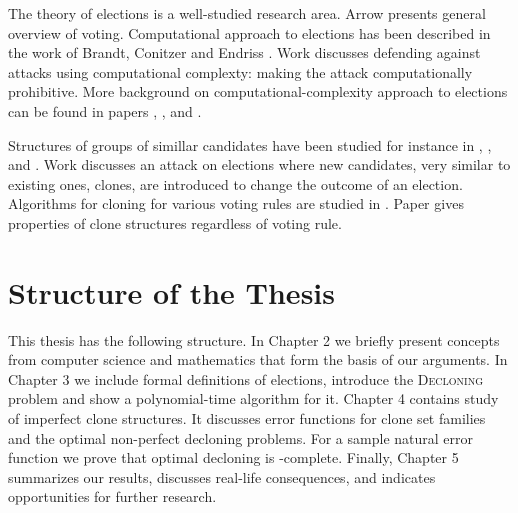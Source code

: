 The theory of elections is a well-studied research area.
Arrow \cite{handbook} presents general overview of voting.
Computational approach to elections has been described in the work of
Brandt, Conitzer and Endriss \cite{compsocialchoice}.
Work \cite{usingcomplexity} discusses defending against attacks using computational complexty:
making the attack computationally prohibitive.
More background on computational-complexity approach to elections
can be found in papers \cite{usingcomp1}, \cite{usingcomp2}, and \cite{controlbyadding}.

Structures of groups of simillar candidates have been studied for instance in
\cite{clones1}, \cite{clones2}, and \cite{clones3}.
Work \cite{independenceofclones} discusses an attack on elections where new candidates,
very similar to existing ones, clones, are introduced to change the outcome of an election.
Algorithms for cloning for various voting rules are studied in \cite{cloninginelections}.
Paper \cite{clonestructures} gives properties of clone structures regardless of voting rule.


\section{Structure of the Thesis}

This thesis has the following structure.
In Chapter 2 we briefly present concepts from computer science
and mathematics that form the basis of our arguments.
In Chapter 3 we include formal definitions of elections, introduce the \textsc{Decloning} problem
and show a polynomial-time algorithm for it.
Chapter 4 contains study of imperfect clone structures.
It discusses error functions for clone set families and the optimal non-perfect decloning problems.
For a sample natural error function we prove that optimal decloning is \np-complete.
Finally, Chapter 5 summarizes our results, discusses real-life consequences,
and indicates opportunities for further research.
